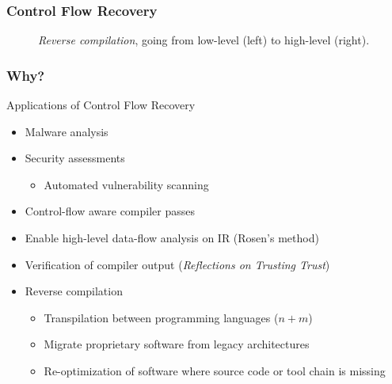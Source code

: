 \documentclass[aspectratio=1610]{beamer}
\begin{document}
\begin{frame}
	\frametitle{Control Flow Recovery}

	\begin{figure}[htbp]
		\centering
		\begin{subfigure}[t]{0.52\textwidth}
			\centering
			
		\end{subfigure}
		\quad
		\begin{subfigure}[t]{0.27\textwidth}
			\centering
			
		\end{subfigure}
		\caption{\textit{Reverse compilation}, going from low-level (left) to high-level (right).}
	\end{figure}

\end{frame}




\begin{frame}
	\frametitle{Why?}

	\begin{block}{Applications of Control Flow Recovery}
		\begin{itemize}
			\item Malware analysis
			\item Security assessments
			\begin{itemize}
				\item Automated vulnerability scanning
			\end{itemize}
			\item Control-flow aware compiler passes
			\item Enable high-level data-flow analysis on IR (Rosen's method)
			\item Verification of compiler output (\textit{Reflections on Trusting Trust})
			\item Reverse compilation
			\begin{itemize}
				\item Transpilation between programming languages ($n + m$)
				\item Migrate proprietary software from legacy architectures
				\item Re-optimization of software where source code or tool chain is missing
			\end{itemize}
		\end{itemize}
	\end{block}
\end{frame}
\end{document}
